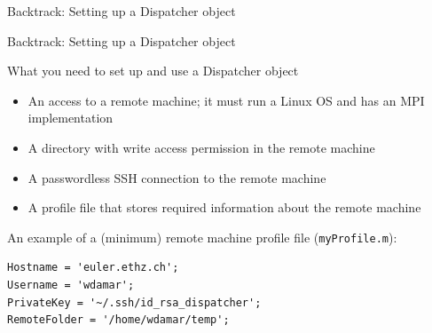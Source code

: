 \documentclass[]{rsuqbeamernew}
\begin{document}
\begin{frame}[fragile]{Backtrack: Setting up a Dispatcher object}


\end{frame}

\begin{frame}[fragile]{Backtrack: Setting up a Dispatcher object}

\begin{block}{What you need to set up and use a Dispatcher object}
\begin{itemize}
  \item An access to a remote machine; it must run a Linux OS and has an MPI implementation
  \item A directory with write access permission in the remote machine
  \item A passwordless SSH connection to the remote machine
  \item A profile file that stores required information about the remote machine 
\end{itemize}
\end{block}
  
An example of a (minimum) remote machine profile file (\texttt{myProfile.m}):
\begin{lstlisting}[basicstyle=\scriptsize]
Hostname = 'euler.ethz.ch';
Username = 'wdamar';
PrivateKey = '~/.ssh/id_rsa_dispatcher';
RemoteFolder = '/home/wdamar/temp';
\end{lstlisting}
  
\end{frame}
\end{document}
